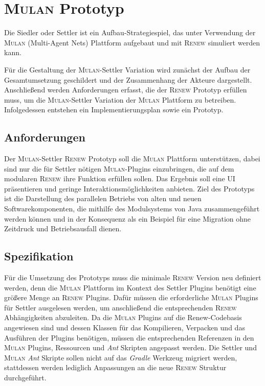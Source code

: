 \chapter{\textsc{Mulan} Prototyp} \label{cha:mulan_settler}
	Die Siedler oder Settler ist ein Aufbau-Strategiespiel, das unter Verwendung der \textsc{Mulan} (Multi-Agent Nets) Plattform aufgebaut und mit \textsc{Renew} simuliert werden kann. \bigbreak
	
	Für die Gestaltung der \textsc{Mulan}-Settler Variation wird zunächst der Aufbau der Gesamtumsetzung geschildert und der Zusammenhang der Akteure dargestellt. Anschließend werden Anforderungen erfasst, die der \textsc{Renew} Prototyp erfüllen muss, um die \textsc{Mulan}-Settler Variation der \textsc{Mulan} Plattform zu betreiben. Infolgedessen entstehen ein Implementierungsplan sowie ein Prototyp.

\section{Anforderungen} \label{sec:anforderungen2}
	Der \textsc{Mulan}-Settler \textsc{Renew} Prototyp soll die \textsc{Mulan} Plattform unterstützen, dabei sind nur die für Settler nötigen \textsc{Mulan}-Plugins einzubringen, die auf dem modularen \textsc{Renew} ihre Funktion erfüllen sollen. Das Ergebnis soll eine UI präsentieren und geringe Interaktionsmöglichkeiten anbieten.\newline 
	Ziel des Prototyps ist die Darstellung des parallelen Betriebs von alten und neuen Softwarekomponenten, die mithilfe des Modulsystems von Java zusammengeführt werden können und in der Konsequenz als ein Beispiel für eine Migration ohne Zeitdruck und Betriebsausfall dienen.

\section{Spezifikation}
	Für die Umsetzung des Prototyps muss die minimale \textsc{Renew} Version neu definiert werden, denn die \textsc{Mulan} Plattform im Kontext des Settler Plugins benötigt eine größere Menge an \textsc{Renew} Plugins. Dafür müssen die erforderliche \textsc{Mulan} Plugins für Settler ausgelesen werden, um anschließend die entsprechenden \textsc{Renew} Abhängigkeiten abzuleiten. \newline
	Da die \textsc{Mulan} Plugins auf die Renew-Codebasis angewiesen sind und dessen Klassen für das Kompilieren, Verpacken und das Ausführen der Plugins benötigen, müssen die entsprechenden Referenzen in den \textsc{Mulan} Plugins, Ressourcen und \textit{Ant} Skripten angepasst werden. \newline
	Die Settler und \textsc{Mulan} \textit{Ant} Skripte sollen nicht auf das \textit{Gradle} Werkzeug migriert werden, stattdessen werden lediglich Anpassungen an die neue \textsc{Renew} Struktur durchgeführt.\bigbreak
	
